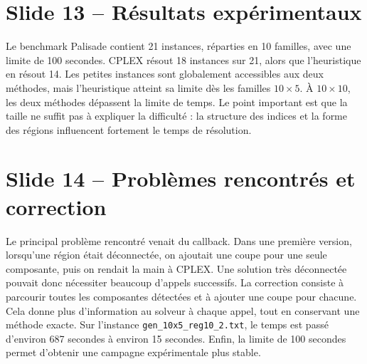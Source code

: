 \documentclass[11pt,a4paper]{article}
\begin{document}
\section*{Slide 13 -- Résultats expérimentaux}

Le benchmark Palisade contient 21 instances, réparties en 10 familles, avec une limite de 100 secondes. CPLEX résout 18 instances sur 21, alors que l'heuristique en résout 14. Les petites instances sont globalement accessibles aux deux méthodes, mais l'heuristique atteint sa limite dès les familles \(10\times5\). À \(10\times10\), les deux méthodes dépassent la limite de temps. Le point important est que la taille ne suffit pas à expliquer la difficulté : la structure des indices et la forme des régions influencent fortement le temps de résolution.

\section*{Slide 14 -- Problèmes rencontrés et correction}

Le principal problème rencontré venait du callback. Dans une première version, lorsqu'une région était déconnectée, on ajoutait une coupe pour une seule composante, puis on rendait la main à CPLEX. Une solution très déconnectée pouvait donc nécessiter beaucoup d'appels successifs. La correction consiste à parcourir toutes les composantes détectées et à ajouter une coupe pour chacune. Cela donne plus d'information au solveur à chaque appel, tout en conservant une méthode exacte. Sur l'instance \texttt{gen\_10x5\_reg10\_2.txt}, le temps est passé d'environ 687 secondes à environ 15 secondes. Enfin, la limite de 100 secondes permet d'obtenir une campagne expérimentale plus stable.
\end{document}
